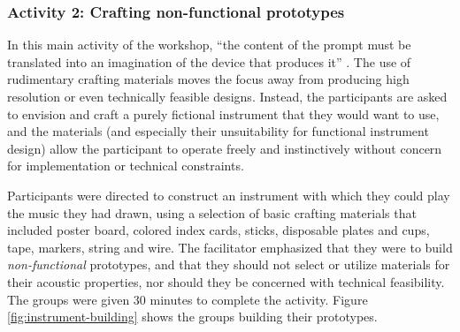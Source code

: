 \documentclass[letterpaper, 12pt]{article}
\begin{document}
\subsubsection{Activity 2: Crafting non-functional prototypes}
\label{sec:activity-2-crafting-non-functional-prototypes}

In this main activity of the workshop, ``the content of the prompt must be translated into an imagination of the device that produces it'' \citep[p. 5]{Andersen2019}. The use of rudimentary crafting materials moves the focus away from producing high resolution or even technically feasible designs. Instead, the participants are asked to envision and craft a purely fictional instrument that they would want to use, and the materials (and especially their unsuitability for functional instrument design) allow the participant to operate freely and instinctively without concern for implementation or technical constraints.

Participants were directed to construct an instrument with which they could play the music they had drawn, using a selection of basic crafting materials that included poster board, colored index cards, sticks, disposable plates and cups, tape, markers, string and wire. The facilitator emphasized that they were to build \emph{non-functional} prototypes, and that they should not select or utilize materials for their acoustic properties, nor should they be concerned with technical feasibility. The groups were given 30 minutes to complete the activity. Figure \ref{fig:instrument-building} shows the groups building their prototypes.
\end{document}
